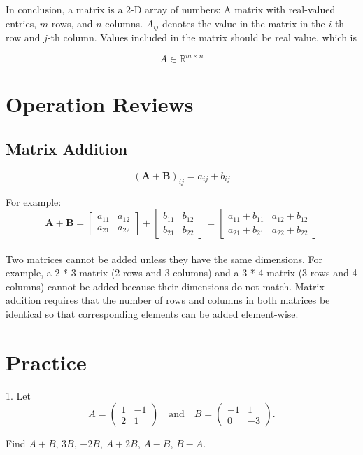 \documentclass[11pt]{article}
\begin{document}
In conclusion, a matrix is a 2-D array of numbers: A matrix with real-valued entries, \( m \) rows, and \( n \) columns.
\( A_{ij} \) denotes the value in the matrix in the \( i \)-th row and \( j \)-th column. Values included in the matrix should 
be real value,  which is 

\[
A \in \mathbb{R}^{m \times n}
\]


\section{Operation Reviews}

    \subsection{Matrix Addition}

    \[
(\mathbf{A} + \mathbf{B})_{ij} = a_{ij} + b_{ij}
\]

For example:
    \[
\mathbf{A} + \mathbf{B} =
\begin{bmatrix}
a_{11} & a_{12} \\
a_{21} & a_{22}
\end{bmatrix}
+
\begin{bmatrix}
b_{11} & b_{12} \\
b_{21} & b_{22}
\end{bmatrix}
=
\begin{bmatrix}
a_{11} + b_{11} & a_{12} + b_{12} \\
a_{21} + b_{21} & a_{22} + b_{22}
\end{bmatrix}
\]
\\
    Two matrices cannot be added unless they have the same dimensions.
For example, a 2 * 3 matrix (2 rows and 3 columns) and a 3 * 4 matrix (3 rows and 4 columns) cannot be added because their dimensions do not match.
    Matrix addition requires that the number of rows and columns in both matrices be identical so that corresponding elements can be added element-wise.


    \section{Practice}
    1. Let
\[
A =
\begin{pmatrix}
1 & -1 \\
2 & 1
\end{pmatrix}
\quad \text{and} \quad
B =
\begin{pmatrix}
-1 & 1 \\
0 & -3
\end{pmatrix}.
\]

Find \( A + B \), \( 3B \), \( -2B \), \( A + 2B \), \( A - B \), \( B - A \).
\end{document}
